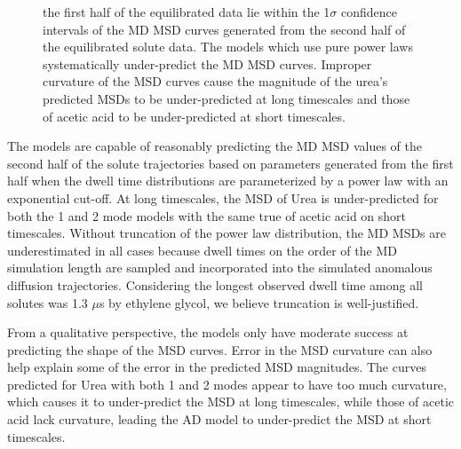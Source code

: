 \documentclass{article}
\begin{document}
\begin{figure}
{  the first half of the equilibrated data lie within the 1$\sigma$ confidence
  intervals of the MD MSD curves generated from the second half of the equilibrated
  solute data. The models which use pure power laws systematically under-predict
  the MD MSD curves. 
Improper curvature of the MSD curves cause the magnitude of
  the urea's predicted MSDs to be under-predicted at long timescales and those
  of acetic acid to be under-predicted at short timescales.}\label{fig:train_test}
  \end{figure}
  
  The models are capable of reasonably predicting the MD MSD values of the second
  half of the solute trajectories based on parameters generated from the first half
  when the dwell time distributions are parameterized by a power law with an 
  exponential cut-off. At long timescales, the MSD of Urea is under-predicted 
  for both the 1 and 2 mode models with the same true of acetic acid on short 
  timescales. Without truncation of the power law distribution, the MD 
  MSDs are underestimated in all cases because dwell times on the order of the
  MD simulation length are sampled and incorporated into the simulated anomalous
  diffusion trajectories. Considering the longest observed dwell time among all
  solutes was 1.3 $\mu$s by ethylene glycol, we believe truncation is well-justified.
  
  
  From a qualitative perspective, the models only have moderate success at predicting
  the shape of the MSD curves. Error in the MSD curvature can also help explain some of
  the error in the predicted MSD magnitudes. The curves predicted for Urea with both 1 
  and 2 modes appear to have too much curvature, which causes it to under-predict the 
  MSD at long timescales, while those of acetic acid lack curvature, leading the
  AD model to under-predict the MSD at short timescales. 
  
\end{document}
